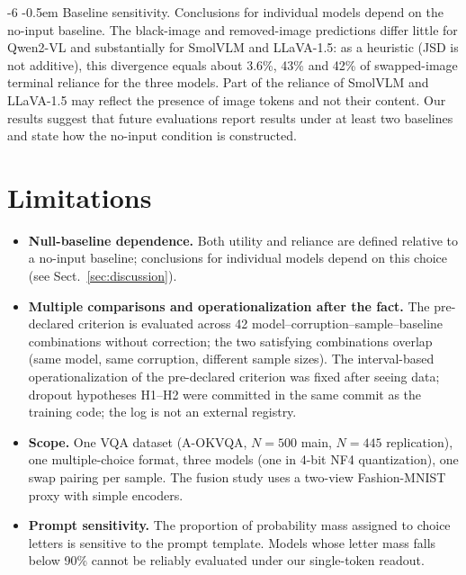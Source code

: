 \documentclass[graybox]{svmult}
\makeatletter
\newcommand{\checknum}[2]{#1}
\renewcommand\paragraph{\@startsection{paragraph}{4}{\z@}%
  {-6\p@ \@plus -2\p@ \@minus -2\p@}%
  {-0.5em}%
  {\normalfont\normalsize\bfseries}}
\makeatother
\begin{document}
\paragraph{Baseline sensitivity.}
Conclusions for individual models depend on the no-input baseline. The
black-image and removed-image predictions differ little for Qwen2-VL and
substantially for SmolVLM and LLaVA-1.5: as a heuristic (JSD is not
additive), this divergence equals about
\checknum{3.6}{floor:Qwen2-VL-2B-Instruct:floor_pct}\%,
\checknum{43}{floor:SmolVLM-Instruct:floor_pct}\% and
\checknum{42}{floor:llava-1.5-7b-hf:floor_pct}\% of swapped-image terminal
reliance for the three models. Part of the reliance of SmolVLM and
LLaVA-1.5 may reflect the presence of image tokens and not their content.
Our results suggest that future evaluations report results under at least two
baselines and state how the no-input condition is constructed.

\section{Limitations}
\label{sec:limitations}

\begin{itemize}
\item \textbf{Null-baseline dependence.} Both utility and reliance are
  defined relative to a no-input baseline; conclusions for individual
  models depend on this choice (see Sect.~\ref{sec:discussion}).

\item \textbf{Multiple comparisons and operationalization after the fact.} The
  pre-declared criterion is evaluated across 42
  model--corruption--sample--baseline combinations without correction; the
  two satisfying combinations overlap (same model, same corruption, different
  sample sizes). The interval-based operationalization of the pre-declared
  criterion was fixed after seeing data; dropout hypotheses H1--H2 were
  committed in the same commit as the training code; the log is not an external
  registry.

\item \textbf{Scope.} One VQA dataset (A-OKVQA, $N=500$ main,
  $N=445$ replication), one multiple-choice format, three models (one in
  4-bit NF4 quantization), one swap pairing per sample. The fusion study
  uses a two-view Fashion-MNIST proxy with simple encoders.

\item \textbf{Prompt sensitivity.} The proportion of probability mass
  assigned to choice letters is sensitive to the prompt template. Models
  whose letter mass falls below 90\% cannot be reliably evaluated under
  our single-token readout.
\end{itemize}
\end{document}

